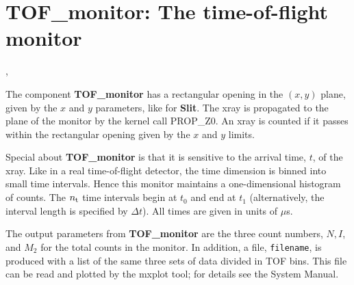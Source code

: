 \section{TOF\_monitor: The time-of-flight monitor}
,{}

The component {\bf TOF\_monitor} has a rectangular opening
in the $(x,y)$ plane, given by the $x$ and $y$ parameters,
like for {\bf Slit}.
The xray is propagated to the plane of the monitor
by the kernel call PROP\_Z0.
An xray is counted if it passes within the rectangular opening
given by the $x$ and $y$ limits.

Special about {\bf TOF\_monitor} is that it is sensitive to
the arrival time, $t$, of the xray.
Like in a real time-of-flight detector, the time dimension is
binned into small time intervals.
Hence this monitor maintains a one-dimensional histogram of counts.
The $n_{\rm t}$ time intervals begin at $t_0$ and
end at $t_1$ (alternatively, the interval length is specified by $\Delta t$).
All times are given in units of $\mu$s.

The output parameters from {\bf TOF\_monitor} are the three count numbers,
$N, I$, and $M_2$ for the total counts in the monitor.
In addition, a file, \verb+filename+, is produced with a list of
the same three sets of data divided in TOF bins.
This file can be read and plotted by the {\rm mxplot} tool; for details see the
System Manual.

